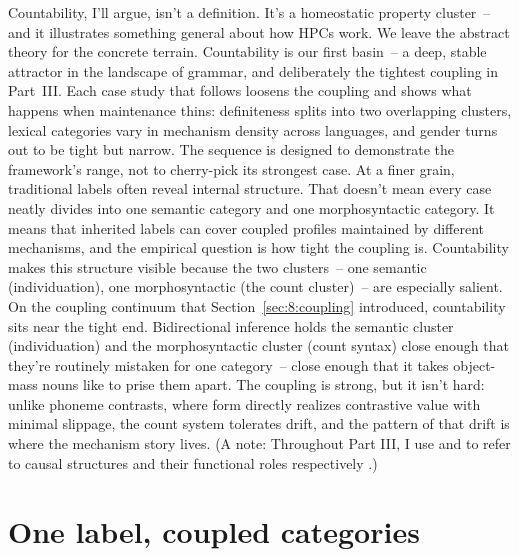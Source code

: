 Countability, I'll argue, isn't a definition. It's a homeostatic property cluster~-- and it illustrates something general about how HPCs work. We leave the abstract theory for the concrete terrain. Countability is our first basin~-- a deep, stable attractor in the landscape of grammar, and deliberately the tightest coupling in Part~III. Each case study that follows loosens the coupling and shows what happens when maintenance thins: definiteness splits into two overlapping clusters, lexical categories vary in mechanism density across languages, and gender turns out to be tight but narrow. The sequence is designed to demonstrate the framework's range, not to cherry-pick its strongest case. At a finer grain, traditional labels often reveal internal structure. That doesn't mean every case neatly divides into one semantic category and one morphosyntactic category. It means that inherited labels can cover coupled profiles maintained by different mechanisms, and the empirical question is how tight the coupling is. Countability makes this structure visible because the two clusters~-- one semantic (individuation), one morphosyntactic (the count cluster)~-- are especially salient. On the coupling continuum that Section~\ref{sec:8:coupling} introduced, countability sits near the tight end. Bidirectional inference holds the semantic cluster (individuation) and the morphosyntactic cluster (count syntax) close enough that they're routinely mistaken for one category~-- close enough that it takes object-mass nouns like  to prise them apart. The coupling is strong, but it isn't hard: unlike phoneme contrasts, where form directly realizes contrastive value with minimal slippage, the count system tolerates drift, and the pattern of that drift is where the mechanism story lives. (A note: Throughout Part III, I use  and  to refer to causal structures and their functional roles respectively \parencite{illari2012}.)

\section{One label, coupled categories}
\label{sec:9:two-categories}

